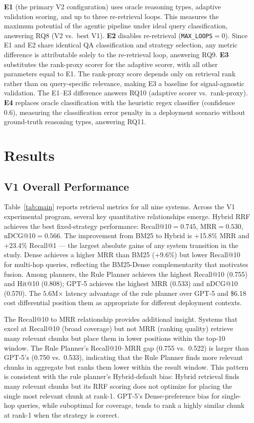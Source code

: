 \documentclass[11pt, a4paper]{article}
\begin{document}
\textbf{E1} (the primary V2 configuration) uses oracle reasoning types, adaptive validation scoring, and up to three re-retrieval loops. This measures the maximum potential of the agentic pipeline under ideal query classification, answering RQ8 (V2 vs.\ best V1). \textbf{E2} disables re-retrieval (\texttt{MAX\_LOOPS}$=0$). Since E1 and E2 share identical QA classification and strategy selection, any metric difference is attributable solely to the re-retrieval loop, answering RQ9. \textbf{E3} substitutes the rank-proxy scorer for the adaptive scorer, with all other parameters equal to E1. The rank-proxy score depends only on retrieval rank rather than on query-specific relevance, making E3 a baseline for signal-agnostic validation. The E1--E3 difference answers RQ10 (adaptive scorer vs.\ rank-proxy). \textbf{E4} replaces oracle classification with the heuristic regex classifier (confidence 0.6), measuring the classification error penalty in a deployment scenario without ground-truth reasoning types, answering RQ11.

\section{Results}
\label{sec:results}

\subsection{V1 Overall Performance}

Table~\ref{tab:main} reports retrieval metrics for all nine systems. Across the V1 experimental program, several key quantitative relationships emerge. Hybrid RRF achieves the best fixed-strategy performance: Recall@10$={0.745}$, MRR$={0.530}$, nDCG@10$={0.566}$. The improvement from BM25 to Hybrid is +15.8\% MRR and +23.4\% Recall@1 --- the largest absolute gains of any system transition in the study. Dense achieves a higher MRR than BM25 (+9.6\%) but lower Recall@10 for multi-hop queries, reflecting the BM25-Dense complementarity that motivates fusion. Among planners, the Rule Planner achieves the highest Recall@10 (0.755) and Hit@10 (0.808); GPT-5 achieves the highest MRR (0.533) and nDCG@10 (0.570). The $5.6$M$\times$ latency advantage of the rule planner over GPT-5 and \$6.18 cost differential position them as appropriate for different deployment contexts.

The Recall@10 to MRR relationship provides additional insight. Systems that excel at Recall@10 (broad coverage) but not MRR (ranking quality) retrieve many relevant chunks but place them in lower positions within the top-10 window. The Rule Planner's Recall@10--MRR gap (0.755 vs.\ 0.522) is larger than GPT-5's (0.750 vs.\ 0.533), indicating that the Rule Planner finds more relevant chunks in aggregate but ranks them lower within the result window. This pattern is consistent with the rule planner's Hybrid-default bias: Hybrid retrieval finds many relevant chunks but its RRF scoring does not optimize for placing the single most relevant chunk at rank-1. GPT-5's Dense-preference bias for single-hop queries, while suboptimal for coverage, tends to rank a highly similar chunk at rank-1 when the strategy is correct.
\end{document}
